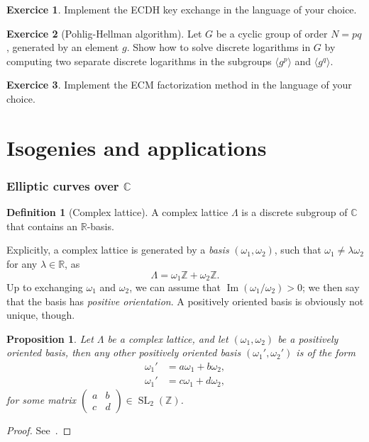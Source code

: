 \documentclass[10pt]{article}
\theoremstyle{plain}
\newtheorem{proposition}[theorem]{Proposition}
\theoremstyle{definition}
\newtheorem{definition}[theorem]{Definition}
\newtheorem{exercice}{Exercice}[part]
\DeclareMathOperator{\im}{Im}
\DeclareMathOperator{\SL}{SL}
\begin{document}
\begin{exercice}
  Implement the ECDH key exchange in the language of your choice.
\end{exercice}

\begin{exercice}[Pohlig-Hellman algorithm]
  Let $G$ be a cyclic group of order $N=pq$, generated by an element
  $g$. %
  Show how to solve discrete logarithms in $G$ by computing two
  separate discrete logarithms in the subgroups $〈g^p〉$ and $〈g^q〉$.
\end{exercice}

\begin{exercice}
  Implement the ECM factorization method in the language of your
  choice.
\end{exercice}


\clearpage
\part{Isogenies and applications}

\section{Elliptic curves over $ℂ$}

\begin{definition}[Complex lattice]
  A complex lattice $Λ$ is a discrete subgroup of $ℂ$ that contains an
  $ℝ$-basis.
\end{definition}

Explicitly, a complex lattice is generated by a \emph{basis}
$(ω_1,ω_2)$, such that $ω_1≠λω_2$ for any $λ∈ℝ$, as
\[Λ = ω_1ℤ + ω_2ℤ.\] %
Up to exchanging $ω_1$ and $ω_2$, we can assume that $\im(ω_1/ω_2)>0$;
we then say that the basis has \emph{positive orientation}. %
A positively oriented basis is obviously not unique, though.

\begin{proposition}
  \label{th:basis-change}
  Let $Λ$ be a complex lattice, and let $(ω_1,ω_2)$ be a positively
  oriented basis, then any other positively oriented basis
  $(ω_1',ω_2')$ is of the form
  \begin{align*}
    ω_1' &= aω_1 + bω_2,\\
    ω_1' &= cω_1 + dω_2,
  \end{align*}
  for some matrix
  $\left(\begin{smallmatrix}a&b\\c&d\end{smallmatrix}\right)∈\SL_2(ℤ)$.
\end{proposition}
\begin{proof}
  See~\cite[I, Lem.~2.4]{silverman:advanced}.
\end{proof}
\end{document}
